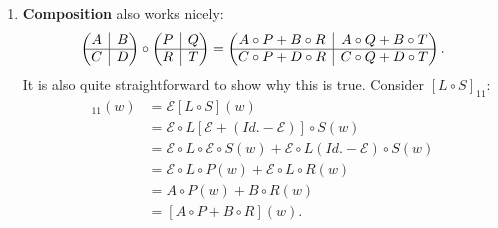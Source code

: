 \documentclass{book}
\theoremstyle{definition}
\newcommand{\E}{\mathcal{E}}
\newcommand{\rvline}{\hspace*{-\arraycolsep}\vline\hspace*{-\arraycolsep}}
\begin{document}
\begin{enumerate}
	
	\item \textbf{Composition} also works nicely:
	\begin{align}
	\begin{pmatrix}
	A & \rvline & B\\
	\hline
	C & \rvline & D
	\end{pmatrix} \circ \begin{pmatrix}
	P & \rvline & Q\\
	\hline
	R & \rvline & T
	\end{pmatrix} 
	=
	\begin{pmatrix}
	A\circ P + B \circ R & \rvline & A \circ Q + B \circ T \\
	\hline
	C \circ P + D \circ R & \rvline & C \circ Q + D \circ T
	\end{pmatrix} .
	\end{align}
	It is also quite straightforward to show why this is true. Consider $[L\circ S]_{11}$:
	\begin{align*}
	[L\circ S]_{11}(w) &= \E[L\circ S](w)\\
	&= \E \circ L[\E + (Id. - \E)]\circ S(w)\\
	&= \E \circ L \circ \E \circ S(w) + \E \circ L (Id. - \E) \circ S(w)\\
	&= \E \circ L \circ P(w) + \E \circ L \circ R(w)\\
	&= A\circ P(w)  +  B \circ R(w)\\
	&= [A\circ P + B \circ R](w).
	\end{align*}
	

\end{enumerate}
\end{document}
